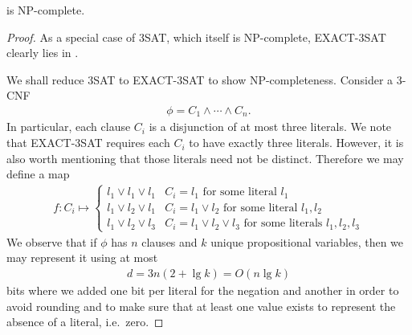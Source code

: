 \documentclass{article}
\begin{document}
\begin{claim*}[a]
	 is NP-complete.
	\begin{proof}
		As a special case of 3SAT, which itself is NP-complete, EXACT-3SAT clearly lies in \nptime.

		We shall reduce 3SAT to EXACT-3SAT to show NP-completeness. Consider a 3-CNF
		\begin{align*}
			\phi = C_1\wedge \cdots\wedge C_n.
		\end{align*}
		In particular, each clause $C_i$ is a disjunction of at most three literals. We note that
		EXACT-3SAT requires each $C_i$ to have exactly three literals. However, it is also worth
		mentioning that those literals need not be distinct. Therefore we may define a map
		\begin{align*}
			f:C_i \mapsto \begin{cases}
				              l_1\vee l_1\vee l_1 & C_i = l_1 \text{ for some literal $l_1$}                              \\
				              l_1\vee l_2\vee l_1 & C_i = l_1 \vee l_2 \text{ for some literal $l_1, l_2$}                \\
				              l_1\vee l_2\vee l_3 & C_i = l_1 \vee l_2 \vee l_3 \text{ for some literals $l_1, l_2, l_3$}
			              \end{cases}
		\end{align*}
		We observe that if $\phi$ has $n$ clauses and $k$ unique propositional variables, then we may represent
		it using at most
		\begin{align*}
			d=3n(2+\lg k)=O(n\lg k)
		\end{align*}
		bits where we added one bit per literal for the negation and another
		in order to avoid rounding and to make sure that at least one value exists to represent the absence of
		a literal, i.e.\ zero.


\end{proof}
\end{claim*}
\end{document}
